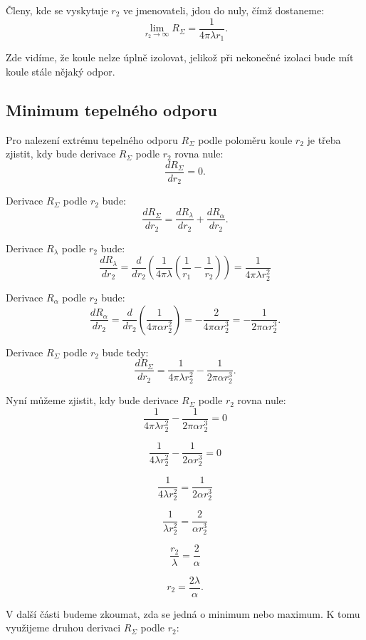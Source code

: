 \documentclass{article}
\begin{document}
Členy, kde se vyskytuje $r_2$ ve jmenovateli, jdou do nuly, čímž dostaneme:
$$
    \lim_{r_2 \to \infty} R_{\Sigma} = \frac{1}{4 \pi \lambda r_1}.
$$

Zde vidíme, že koule nelze úplně izolovat, jelikož při nekonečné izolaci bude mít koule stále nějaký odpor.


\subsection{Minimum tepelného odporu}

Pro nalezení extrému tepelného odporu $R_{\Sigma}$ podle poloměru koule $r_2$ je třeba zjistit, kdy bude derivace $R_{\Sigma}$ podle $r_2$ rovna nule:
$$
    \frac{dR_{\Sigma}}{dr_2} = 0.
$$

Derivace $R_{\Sigma}$ podle $r_2$ bude:
$$
    \frac{dR_{\Sigma}}{dr_2} = \frac{dR_{\lambda}}{dr_2} + \frac{dR_{\alpha}}{dr_2}.
$$

Derivace $R_{\lambda}$ podle $r_2$ bude:
$$
    \frac{dR_{\lambda}}{dr_2} = \frac{d}{dr_2} \left( \frac{1}{4 \pi \lambda} \left( \frac{1}{r_1} - \frac{1}{r_2} \right) \right) = \frac{1}{4 \pi \lambda r_2^2}
$$

Derivace $R_{\alpha}$ podle $r_2$ bude:
$$
    \frac{dR_{\alpha}}{dr_2} = \frac{d}{dr_2} \left( \frac{1}{4 \pi \alpha r_2^2} \right) = -\frac{2}{4 \pi \alpha r_2^3} = -\frac{1}{2 \pi \alpha r_2^3}.
$$

Derivace $R_{\Sigma}$ podle $r_2$ bude tedy:
$$
    \frac{dR_{\Sigma}}{dr_2} = \frac{1}{4 \pi \lambda r_2^2} - \frac{1}{2 \pi \alpha r_2^3}.
$$

Nyní můžeme zjistit, kdy bude derivace $R_{\Sigma}$ podle $r_2$ rovna nule:
$$
    \frac{1}{4 \pi \lambda r_2^2} - \frac{1}{2 \pi \alpha r_2^3} = 0
$$

$$
    \frac{1}{4 \lambda r_2^2} - \frac{1}{2 \alpha r_2^3} = 0
$$

$$
    \frac{1}{4 \lambda r_2^2} = \frac{1}{2 \alpha r_2^3}
$$

$$
    \frac{1}{\lambda r_2^2} = \frac{2}{\alpha r_2^3}
$$

$$
    \frac{r_2}{\lambda} = \frac{2}{\alpha}
$$

$$
    r_2 = \frac{2 \lambda}{\alpha}.
$$

V další části budeme zkoumat, zda se jedná o minimum nebo maximum. K tomu využijeme druhou derivaci $R_{\Sigma}$ podle $r_2$:
\end{document}
